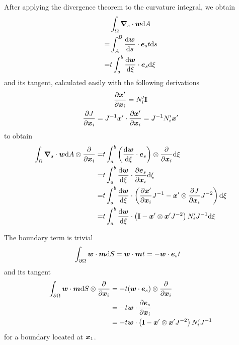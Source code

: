 \documentclass[a4paper,11pt]{article}
\renewcommand{\to}[1]{\text{\boldmath $#1$}} %
\newcommand{\ts}[1]{\text{\boldmath $\mathrm{#1}$}} %
\newcommand{\intd}[1]{\mathrm{d}#1}
\newcommand{\pderiv}[2]{\frac{\partial#1}{\partial#2}}
\newcommand{\dderiv}[2]{\frac{\mathrm{d}#1}{\mathrm{d}#2}}
\begin{document}
After applying the divergence theorem to the curvature integral, we obtain
\begin{align}
  &\int_\Omega\to \nabla_s\cdot\to w\intd A\\
 =&\int_A^B\dderiv{\to w}{s}\cdot\to e_s t \intd s\\
 =&t \int_a^b \dderiv{\to w}{\xi}\cdot \to e_s \intd\xi\\
\end{align}
and its tangent, calculated easily with the following derivations
\begin{gather}
 \pderiv{\to x'}{\to x_i} = N_i' \ts I\\
 \pderiv{J}{\to x_i} = J^{-1} \to x'\cdot \pderiv{\to x'}{\to x_i} = J^{-1} N_i' \to x'
\end{gather}
to obtain
\begin{align}
 \int_\Omega\to \nabla_s\cdot\to w\intd A \otimes \pderiv{}{\to x_i}
 =&t \int_a^b \left(\dderiv{\to w}{\xi}\cdot \to e_s\right)\otimes \pderiv{}{\to x_i}  \intd\xi\\
 =&t \int_a^b \dderiv{\to w}{\xi}\cdot \pderiv{\to e_s}{\to x_i} \intd\xi\\
 =&t \int_a^b \dderiv{\to w}{\xi}\cdot \left(\pderiv{\to x'}{\to x_i}J^{-1}-\to x'\otimes\pderiv{J}{\to x_i}J^{-2}\right) \intd\xi\\
 =&t \int_a^b \dderiv{\to w}{\xi}\cdot \left(\ts I-\to x'\otimes\to x' J^{-2}\right)N_i' J^{-1} \intd\xi
\end{align}

The boundary term is trivial
\begin{align}
 &\int_{\partial\Omega} \to w\cdot \to m\intd S = \to w \cdot\to m t = - \to w \cdot \to e_s t
\end{align}
and its tangent
\begin{align}
 \int_{\partial\Omega} \to w\cdot \to m\intd S\otimes \pderiv{}{\to x_i} &= -t(\to w \cdot \to e_s)\otimes \pderiv{}{\to x_i}\\
 &= -t \to w\cdot\pderiv{\to e_s}{\to x_i}\\
 &= -t \to w\cdot \left(\ts I-\to x'\otimes\to x' J^{-2}\right)N_i' J^{-1}
\end{align}
for a boundary located at $\to x_1$.
\end{document}
